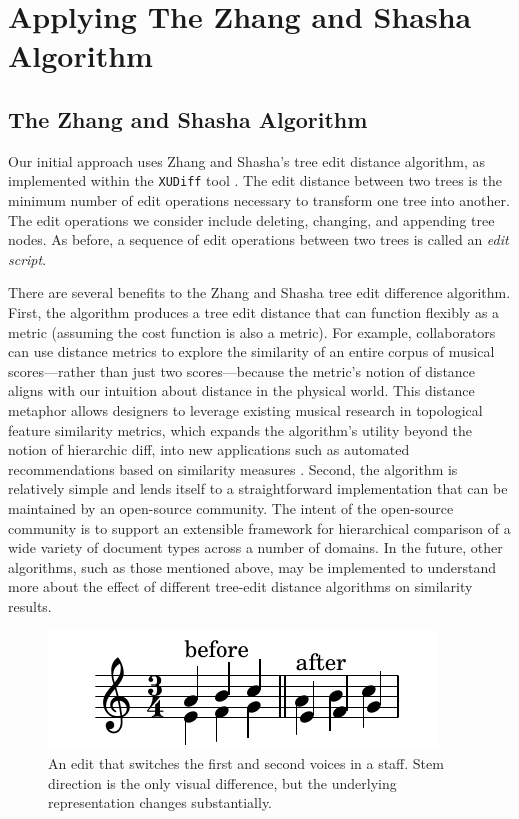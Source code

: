 \documentclass{article}
\begin{document}
\section{Applying The Zhang and Shasha Algorithm}
\subsection{The Zhang and Shasha Algorithm}
Our initial approach uses Zhang and Shasha's tree edit distance
algorithm, as implemented within the \texttt{XUDiff} tool
\cite{Weaver:2013sl}.  The edit distance between two trees is the
minimum number of edit operations necessary to transform one tree into
another.  The edit operations we consider include deleting, changing, and appending tree nodes.  As before, a sequence of edit operations
between two trees is called an \emph{edit script}.



There are several benefits to the Zhang and Shasha tree edit
difference algorithm.  First, the algorithm produces a tree edit
distance that can function flexibly as a metric (assuming the cost function is also a metric). For example, collaborators
can use distance metrics to explore the similarity of an entire corpus of 
musical scores---rather than just two scores---because the metric's notion of distance aligns
with our intuition about distance in the physical world. This distance metaphor allows designers to leverage existing musical research in topological feature similarity metrics, which expands the algorithm's utility beyond the notion of hierarchic diff, into new applications such as automated recommendations based on similarity measures \cite{bello2011measuring,berenzweig2004large,panagakis2010music}. Second, the
algorithm is relatively simple and lends itself to a
straightforward implementation that can be maintained by an
open-source community.  The intent of the open-source community is to
support an extensible framework for hierarchical comparison of a wide
variety of document types across a number of domains.  In the future,
other algorithms, such as those mentioned above, may be implemented to
understand more about the effect of different tree-edit distance
algorithms on similarity results.

\begin{figure}[!htb]
\centering
\includegraphics[width=0.7\columnwidth]{layers.pdf}
\caption{An edit that switches the first and second voices in a staff. Stem direction is the only visual difference, but the underlying representation changes substantially.}
\label{fig:voice_swap}
\end{figure}
\end{document}
